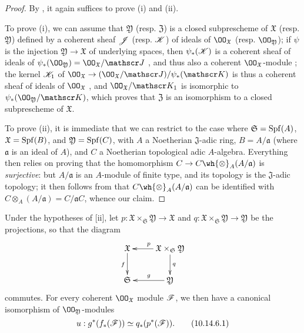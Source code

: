 \begin{proof}
\label{proof-1.10.14.5}
By , it again suffices to prove (i) and (ii).

To prove (i), we can assume that $\mathfrak{Y}$ (resp. $\mathfrak{Z}$) is a closed subprescheme of $\mathfrak{X}$ (resp. $\mathfrak{Y}$) defined by a coherent sheaf $\mathscr{J}$ (resp. $\mathscr{K}$) of ideals of $\OO_\mathfrak{X}$ (resp. $\OO_\mathfrak{Y}$);
if $\psi$ is the injection $\mathfrak{Y}\to\mathfrak{X}$ of underlying spaces, then $\psi_*(\mathscr{K})$ is a coherent sheaf of ideals of $\psi_*(\OO_\mathfrak{Y})=\OO_\mathfrak{X}/\sh{J}$ , and thus also a coherent $\OO_\mathfrak{X}$-module ;
the kernel $\mathscr{K}_1$ of $\OO_\mathfrak{X}\to(\OO_\mathfrak{X}/\sh{J})/\psi_*(\sh{K})$ is thus a coherent sheaf of ideals of $\OO_\mathfrak{X}$ , and $\OO_\mathfrak{X}/\sh{K}_1$ is isomorphic to $\psi_*(\OO_\mathfrak{Y}/\sh{K})$, which proves that $\mathfrak{Z}$ is an isomorphism to a closed subprescheme of $\mathfrak{X}$.

To prove (ii), it is immediate that we can restrict to the case where $\mathfrak{S}=\operatorname{Spf}(A)$, $\mathfrak{X}=\operatorname{Spf}(B)$, and $\mathfrak{Y}=\operatorname{Spf}(C)$, with $A$ a Noetherian $\mathfrak{J}$-adic ring, $B=A/\mathfrak{a}$ (where $\mathfrak{a}$ is an ideal of $A$), and $C$ a Noetherian topological adic $A$-algebra.
Everything then relies on proving that the homomorphism $C\to C\wh{\otimes}_A(A/\mathfrak{a})$ is \emph{surjective}:
but $A/\mathfrak{a}$ is an $A$-module of finite type, and its topology is the $\mathfrak{J}$-adic topology;
it then follows from  that $C\wh{\otimes}_A(A/\mathfrak{a})$ can be identified with $C\otimes_A(A/\mathfrak{a})=C/\mathfrak{a}C$, whence our claim.
\end{proof}

\begin{cor}[10.14.6]
\label{1.10.14.6}
Under the hypotheses of [ii], let $p:\mathfrak{X}\times_\mathfrak{S}\mathfrak{Y}\to\mathfrak{X}$ and $q:\mathfrak{X}\times_\mathfrak{S}\mathfrak{Y}\to\mathfrak{Y}$ be the projections, so that the diagram
\[
  \xymatrix{
    \mathfrak{X}\ar[d]_f &
    \mathfrak{X}\times_\mathfrak{S}\mathfrak{Y}\ar[l]_p\ar[d]^q\\
    \mathfrak{S} &
    \mathfrak{Y}\ar[l]_g
  }
\]
commutes.
For every coherent $\OO_\mathfrak{X}$ module $\mathscr{F}$, we then have a canonical isomorphism of $\OO_\mathfrak{Y}$-modules
\[
  u:g^*(f_*(\mathscr{F}))\simeq q_*(p^*(\mathscr{F})).
  \tag{10.14.6.1}
\]
\end{cor}

